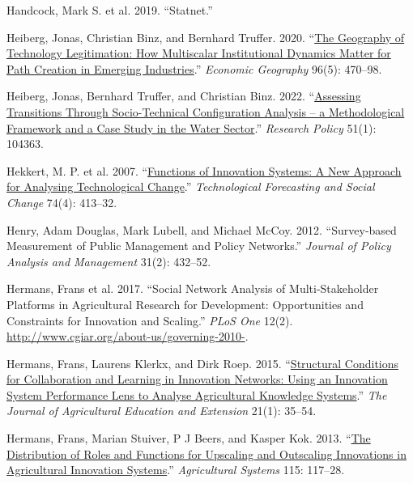 \documentclass[twoside,12pt,final]{ucthesis-CA2012}
\newlength{\cslhangindent}
\newenvironment{CSLReferences}[2] %
 {%
  \setlength{\parindent}{0pt}
  \ifodd #1 \everypar{\setlength{\hangindent}{\cslhangindent}}\ignorespaces\fi
  \ifnum #2 > 0
  \setlength{\parskip}{#2\baselineskip}
  \fi
 }%
 {}
\begin{document}
\begin{ucmainmatter}
\begin{CSLReferences}{1}{0}
\leavevmode{}%
Handcock, Mark S. et al. 2019. {``Statnet.''}

\leavevmode{}%
Heiberg, Jonas, Christian Binz, and Bernhard Truffer. 2020. {``\href{https://doi.org/10.1080/00130095.2020.1842189}{The Geography of Technology Legitimation: How Multiscalar Institutional Dynamics Matter for Path Creation in Emerging Industries}.''} \emph{Economic Geography} 96(5): 470--98.

\leavevmode{}%
Heiberg, Jonas, Bernhard Truffer, and Christian Binz. 2022. {``\href{https://doi.org/10.1016/j.respol.2021.104363}{Assessing Transitions Through Socio-Technical Configuration Analysis -- a Methodological Framework and a Case Study in the Water Sector}.''} \emph{Research Policy} 51(1): 104363.

\leavevmode{}%
Hekkert, M. P. et al. 2007. {``\href{https://doi.org/10.1016/j.techfore.2006.03.002}{Functions of Innovation Systems: A New Approach for Analysing Technological Change}.''} \emph{Technological Forecasting and Social Change} 74(4): 413--32.

\leavevmode{}%
Henry, Adam Douglas, Mark Lubell, and Michael McCoy. 2012. {``Survey‐based Measurement of Public Management and Policy Networks.''} \emph{Journal of Policy Analysis and Management} 31(2): 432--52.

\leavevmode{}%
Hermans, Frans et al. 2017. {``Social Network Analysis of Multi-Stakeholder Platforms in Agricultural Research for Development: Opportunities and Constraints for Innovation and Scaling.''} \emph{PLoS One} 12(2). \url{http://www.cgiar.org/about-us/governing-2010-}.

\leavevmode{}%
Hermans, Frans, Laurens Klerkx, and Dirk Roep. 2015. {``\href{https://doi.org/10.1080/1389224X.2014.991113}{Structural Conditions for Collaboration and Learning in Innovation Networks: Using an Innovation System Performance Lens to Analyse Agricultural Knowledge Systems}.''} \emph{The Journal of Agricultural Education and Extension} 21(1): 35--54.

\leavevmode{}%
Hermans, Frans, Marian Stuiver, P J Beers, and Kasper Kok. 2013. {``\href{https://doi.org/10.1016/j.agsy.2012.09.006}{The Distribution of Roles and Functions for Upscaling and Outscaling Innovations in Agricultural Innovation Systems}.''} \emph{Agricultural Systems} 115: 117--28.


\end{CSLReferences}
\end{ucmainmatter}
\end{document}
